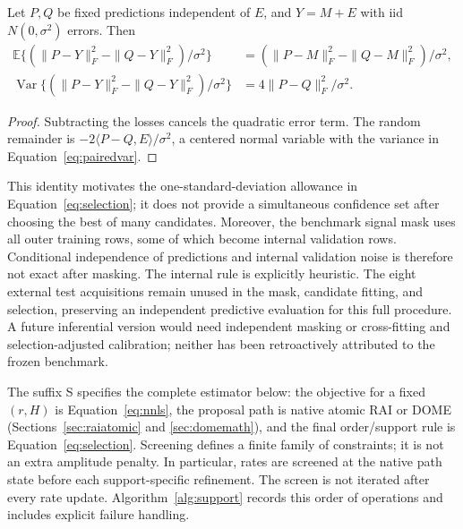 \begin{Proposition}\label{prop:paired}
Let $P,Q$ be fixed predictions independent of $E$, and $Y=M+E$ with iid $N(0,\sigma^2)$ errors. Then
\begin{align}
 \mathbb E\{(\|P-Y\|_F^2-\|Q-Y\|_F^2)/\sigma^2\}
 &= (\|P-M\|_F^2-\|Q-M\|_F^2)/\sigma^2,\label{eq:pairedbias}\\
 \operatorname{Var}\{(\|P-Y\|_F^2-\|Q-Y\|_F^2)/\sigma^2\}
 &=4\|P-Q\|_F^2/\sigma^2.\label{eq:pairedvar}
\end{align}
\end{Proposition}
\begin{proof}
Subtracting the losses cancels the quadratic error term. The random remainder is $-2\langle P-Q,E\rangle/\sigma^2$, a centered normal variable with the variance in Equation~\eqref{eq:pairedvar}.
\end{proof}

This identity motivates the one-standard-deviation allowance in Equation~\eqref{eq:selection}; it does not provide a simultaneous confidence set after choosing the best of many candidates. Moreover, the benchmark signal mask uses all outer training rows, some of which become internal validation rows. Conditional independence of predictions and internal validation noise is therefore not exact after masking. The internal rule is explicitly heuristic. The eight external test acquisitions remain unused in the mask, candidate fitting, and selection, preserving an independent predictive evaluation for this full procedure. A future inferential version would need independent masking or cross-fitting and selection-adjusted calibration; neither has been retroactively attributed to the frozen benchmark.

The suffix S specifies the complete estimator below: the objective for a fixed $(r,H)$ is Equation~\eqref{eq:nnls}, the proposal path is native atomic RAI or DOME (Sections~\ref{sec:raiatomic} and \ref{sec:domemath}), and the final order/support rule is Equation~\eqref{eq:selection}. Screening defines a finite family of constraints; it is not an extra amplitude penalty. In particular, rates are screened at the native path state before each support-specific refinement. The screen is not iterated after every rate update. Algorithm~\ref{alg:support} records this order of operations and includes explicit failure handling.

